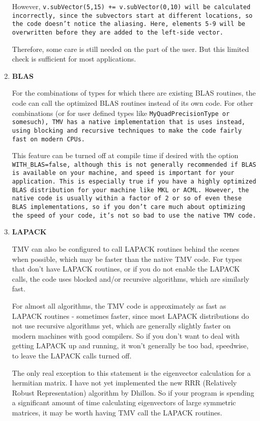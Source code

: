 \begin{enumerate}
However, \tt{v.subVector(5,15) += v.subVector(0,10)} will be calculated 
incorrectly, since the subvectors start at different locations, so the code
doesn't notice the aliasing.  Here, elements 5-9 will be overwritten before
they are added to the left-side vector.

Therefore, some care is still needed on the part of the user.  But this limited check is sufficient
for most applications.

\item
\textbf{BLAS}

For the combinations of types for which there are existing BLAS
routines, the code can call the optimized BLAS routines instead of its own 
code.  For other combinations (or for user defined types like 
\tt{MyQuadPrecisionType} or somesuch), 
TMV has a native implementation that is uses instead, 
using blocking and recursive techniques to make the code fairly fast on modern CPUs.

This feature can be turned off at compile time if desired 
with the option \tt{WITH_BLAS=false},
although this is not generally recommended if 
BLAS is available on your machine, and speed is important for your 
application.  This is especially true if you have a highly optimized BLAS
distribution for your machine like MKL or ACML.  However, 
the native code is usually within a factor of 2 or so of even these BLAS implementations,
so if you don't care much about optimizing the speed of your code, it's not so bad to 
use the native TMV code.
\item
\textbf{LAPACK}

TMV can also be configured to call LAPACK routines behind the scenes when possible, 
which may be faster than the native TMV code.  For types that don't have LAPACK routines, 
or if you do not enable the LAPACK calls,
the code uses blocked and/or recursive algorithms, which are similarly fast.  

For almost all algorithms, 
the TMV code is approximately as fast as LAPACK routines -
sometimes faster, since most
LAPACK distributions do not use recursive algorithms yet, which are generally
slightly faster on modern machines with good compilers. 
So if you don't want to deal with getting LAPACK
up and running, it won't generally be too bad, speedwise, 
to leave the LAPACK calls turned off.

The only real exception to this statement
is the eigenvector calculation for a hermitian matrix.  I have not yet 
implemented the new RRR
(Relatively Robust Representation) algorithm by Dhillon.  So if your program is
spending a significant amount of time calculating eigenvectors of large symmetric matrices,
it may be worth having TMV call the LAPACK routines.


\end{enumerate}

